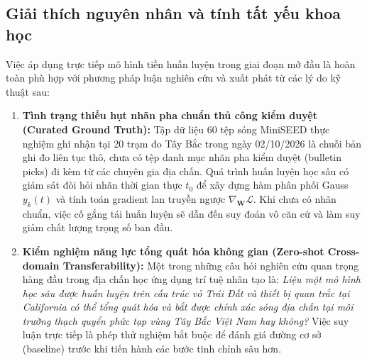 \documentclass[preprint,1p]{elsarticle}
\begin{document}
\subsection{Giải thích nguyên nhân và tính tất yếu khoa học}
Việc áp dụng trực tiếp mô hình tiền huấn luyện trong giai đoạn mở đầu là hoàn toàn phù hợp với phương pháp luận nghiên cứu và xuất phát từ các lý do kỹ thuật sau:
\begin{enumerate}
    \item \textbf{Tình trạng thiếu hụt nhãn pha chuẩn thủ công kiểm duyệt (Curated Ground Truth):} Tập dữ liệu 60 tệp sóng MiniSEED thực nghiệm ghi nhận tại 20 trạm đo Tây Bắc trong ngày 02/10/2026 là chuỗi bản ghi đo liên tục thô, chưa có tệp danh mục nhãn pha kiểm duyệt (bulletin picks) đi kèm từ các chuyên gia địa chấn. Quá trình huấn luyện học sâu có giám sát đòi hỏi nhãn thời gian thực $t_0$ để xây dựng hàm phân phối Gauss $y_k(t)$ và tính toán gradient lan truyền ngược $\nabla_\mathbf{W} \mathcal{L}$. Khi chưa có nhãn chuẩn, việc cố gắng tái huấn luyện sẽ dẫn đến suy đoán vô căn cứ và làm suy giảm chất lượng trọng số ban đầu.
    \item \textbf{Kiểm nghiệm năng lực tổng quát hóa không gian (Zero-shot Cross-domain Transferability):} Một trong những câu hỏi nghiên cứu quan trọng hàng đầu trong địa chấn học ứng dụng trí tuệ nhân tạo là: \textit{Liệu một mô hình học sâu được huấn luyện trên cấu trúc vỏ Trái Đất và thiết bị quan trắc tại California có thể tổng quát hóa và bắt được chính xác sóng địa chấn tại môi trường thạch quyển phức tạp vùng Tây Bắc Việt Nam hay không?} Việc suy luận trực tiếp là phép thử nghiệm bắt buộc để đánh giá đường cơ sở (baseline) trước khi tiến hành các bước tinh chỉnh sâu hơn.
\end{enumerate}
\end{document}
